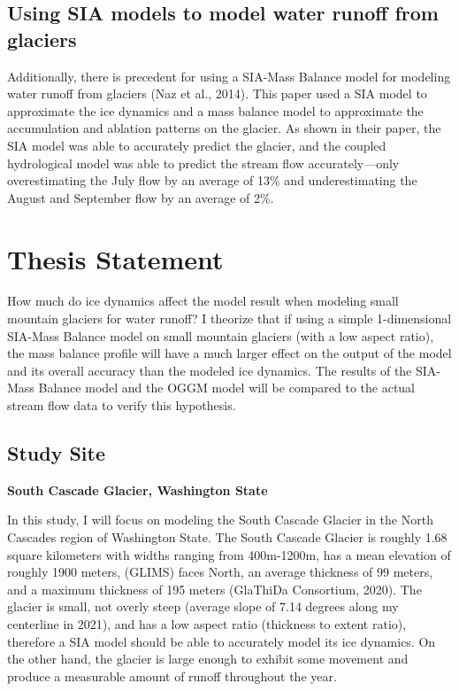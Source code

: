 \documentclass{article}
\begin{document}
\subsection{Using SIA models to model water runoff from glaciers}
    Additionally, there is precedent for using a SIA-Mass Balance model for modeling water runoff from glaciers (Naz et al., 2014). This paper used 
a SIA model to approximate the ice dynamics and a mass balance model to approximate the accumulation and ablation patterns on the glacier. 
As shown in their paper, the SIA model was able to accurately predict the glacier, and the coupled hydrological model was able to predict 
the stream flow accurately---only overestimating the July flow by an average of 13\% and underestimating the August and September flow by an 
average of 2\%.

\section{Thesis Statement}
How much do ice dynamics affect the model result when modeling small mountain glaciers for water runoff? I theorize that if using a simple 
1-dimensional SIA-Mass Balance model on small mountain glaciers (with a low aspect ratio), the mass balance profile will have a 
much larger effect on the output of the model and its overall accuracy than the modeled ice dynamics. The results of the SIA-Mass Balance 
model and the OGGM model will be compared to the actual stream flow data to verify this hypothesis.
\subsection{Study Site}
\textbf{\large South Cascade Glacier, Washington State}

In this study, I will focus on modeling the South Cascade Glacier in the North Cascades region of Washington State. The South Cascade Glacier is 
roughly 1.68 square kilometers with widths ranging from 400m-1200m, has a mean elevation of roughly 1900 meters, (GLIMS) faces North, an average thickness of 99 meters, and a 
maximum thickness of 195 meters (GlaThiDa Consortium, 2020). The glacier is small, not overly steep (average slope of 7.14 degrees along my 
centerline in 2021), and has a low aspect ratio (thickness to extent ratio), therefore a
SIA model should be able to accurately model its ice dynamics. On the other hand, the glacier is large enough to exhibit some movement 
and produce a measurable amount of runoff throughout the year. 
\end{document}
